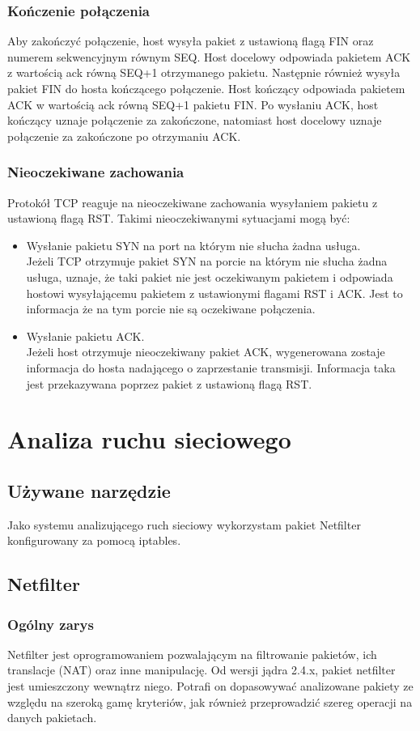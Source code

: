 \documentclass[a4paper,12pt,oneside]{book}
\begin{document}
		\subsection{Kończenie połączenia}
			Aby zakończyć połączenie, host wysyła pakiet z ustawioną flagą FIN oraz numerem sekwencyjnym równym SEQ.
			Host docelowy odpowiada pakietem ACK z wartością ack równą SEQ+1 otrzymanego pakietu.
			Następnie również wysyła pakiet FIN do hosta kończącego połączenie.
			Host kończący odpowiada pakietem ACK w wartością ack równą SEQ+1 pakietu FIN.
			Po wysłaniu ACK, host kończący uznaje połączenie za zakończone, natomiast host docelowy uznaje połączenie za zakończone po otrzymaniu ACK.
		\subsection{Nieoczekiwane zachowania}
			Protokół TCP reaguje na nieoczekiwane zachowania wysyłaniem pakietu z ustawioną flagą RST.
			Takimi nieoczekiwanymi sytuacjami mogą być:
			\begin{itemize}
			\item Wysłanie pakietu SYN na port na którym nie słucha żadna usługa.\\
				Jeżeli TCP otrzymuje pakiet SYN na porcie na którym nie słucha żadna usługa, uznaje, że taki pakiet nie jest oczekiwanym pakietem i odpowiada hostowi wysyłającemu pakietem z ustawionymi flagami RST i ACK.
				Jest to informacja że na tym porcie nie są oczekiwane połączenia.
			\item Wysłanie pakietu ACK.\\
				Jeżeli host otrzymuje nieoczekiwany pakiet ACK, wygenerowana zostaje informacja do hosta nadającego o zaprzestanie transmisji.
				Informacja taka jest przekazywana poprzez pakiet z ustawioną flagą RST.
			\end{itemize}
\chapter{Analiza ruchu sieciowego}
	\section{Używane narzędzie}
		Jako systemu analizującego ruch sieciowy wykorzystam pakiet Netfilter konfigurowany za pomocą iptables.
	\section{Netfilter}
		\subsection{Ogólny zarys}
			Netfilter jest oprogramowaniem pozwalającym na filtrowanie pakietów, ich translacje (NAT) oraz inne manipulację.
			Od wersji jądra 2.4.x, pakiet netfilter jest umieszczony wewnątrz niego.
			Potrafi on dopasowywać analizowane pakiety ze względu na szeroką gamę kryteriów, jak również przeprowadzić szereg operacji na danych pakietach.
\end{document}
